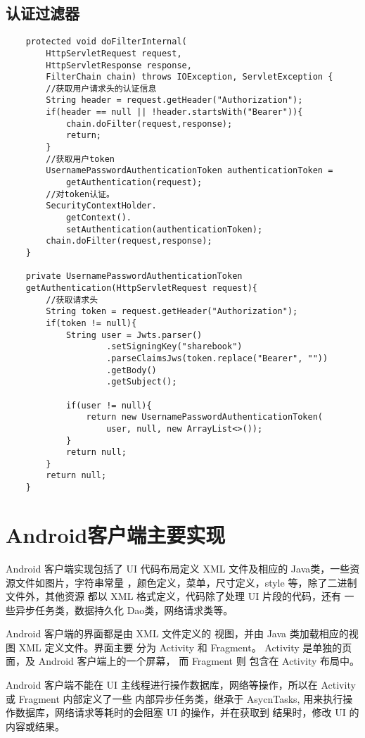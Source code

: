 \subsection{认证过滤器}
\begin{verbatim}
    protected void doFilterInternal(
        HttpServletRequest request,
        HttpServletResponse response, 
        FilterChain chain) throws IOException, ServletException {
        //获取用户请求头的认证信息
        String header = request.getHeader("Authorization");
        if(header == null || !header.startsWith("Bearer")){
            chain.doFilter(request,response);
            return;
        }
        //获取用户token
        UsernamePasswordAuthenticationToken authenticationToken = 
            getAuthentication(request);
        //对token认证。
        SecurityContextHolder.
            getContext().
            setAuthentication(authenticationToken);
        chain.doFilter(request,response);
    }

    private UsernamePasswordAuthenticationToken 
    getAuthentication(HttpServletRequest request){
        //获取请求头
        String token = request.getHeader("Authorization");
        if(token != null){
            String user = Jwts.parser()
                    .setSigningKey("sharebook")
                    .parseClaimsJws(token.replace("Bearer", ""))
                    .getBody()
                    .getSubject();

            if(user != null){
                return new UsernamePasswordAuthenticationToken(
                    user, null, new ArrayList<>());
            }
            return null;
        }
        return null;
    }
\end{verbatim}

\section{Android客户端主要实现}
Android 客户端实现包括了 UI 代码布局定义 XML 文件及相应的 Java类，一些资源文件如图片，字符串常量
，颜色定义，菜单，尺寸定义，style 等，除了二进制文件外，其他资源 都以 XML 格式定义，代码除了处理
 UI 片段的代码，还有 一些异步任务类，数据持久化 Dao类，网络请求类等。

 Android 客户端的界面都是由 XML 文件定义的 视图，并由 Java 类加载相应的视图 XML 定义文件。界面主要
 分为 Activity 和 Fragment。 Activity 是单独的页面，及 Android 客户端上的一个屏幕， 而 Fragment 则
 包含在 Activity 布局中。

 Android 客户端不能在 UI 主线程进行操作数据库，网络等操作，所以在 Activity 或 Fragment 内部定义了一些
 内部异步任务类，继承于 AsycnTasks, 用来执行操作数据库，网络请求等耗时的会阻塞 UI 的操作，并在获取到
 结果时，修改 UI 的内容或结果。

